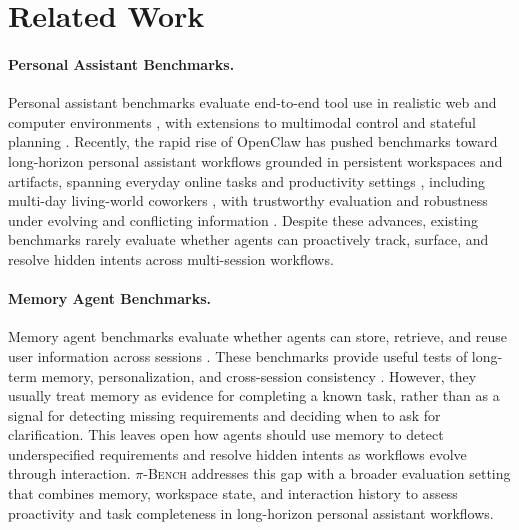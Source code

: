 \documentclass{llmxive}
\providecommand{\bench}{\textsc{$\pi$-Bench}}
\begin{document}
    


\section{Related Work}
\label{sec:related_work}

\paragraph{Personal Assistant Benchmarks.}
Personal assistant benchmarks evaluate end-to-end tool use in realistic web and computer environments \citep{mialon2023gaia,zhou2023webarena,drouin2024workarena}, with extensions to multimodal control and stateful planning \citep{xie2024osworld,malay2026enterpriseops}.
Recently, the rapid rise of OpenClaw \citep{openclaw} has pushed benchmarks toward long-horizon personal assistant workflows grounded in persistent workspaces and artifacts, spanning everyday online tasks and productivity settings \citep{zhang2026clawbench,li2026clawsbench}, including multi-day living-world coworkers \citep{clawmark}, with trustworthy evaluation \citep{ye2026claw} and robustness under evolving and conflicting information \citep{ji2026clawarena}.
Despite these advances, existing benchmarks rarely evaluate whether agents can proactively track, surface, and resolve hidden intents across multi-session workflows.

\paragraph{Memory Agent Benchmarks.}
Memory agent benchmarks evaluate whether agents can store, retrieve, and reuse user information across sessions \citep{shen2026mem2actbench,liu2026memgui,zhang2026memorycd}.
These benchmarks provide useful tests of long-term memory, personalization, and cross-session consistency \citep{he2026memoryarena,kim2026persona2web,liu2026perma}.
However, they usually treat memory as evidence for completing a known task, rather than as a signal for detecting missing requirements and deciding when to ask for clarification.
This leaves open how agents should use memory to detect underspecified requirements and resolve hidden intents as workflows evolve through interaction.
{\bench} addresses this gap with a broader evaluation setting that combines memory, workspace state, and interaction history to assess proactivity and task completeness in long-horizon personal assistant workflows.
\end{document}
